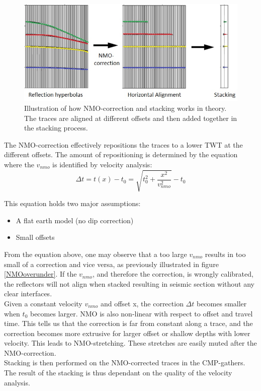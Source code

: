 \documentclass[10pt,a4paper]{article}
\begin{document}
\begin{figure}[H]
\includegraphics[width=\textwidth]{NMOcorr_stacking.jpg}
\caption{Illustration of how NMO-correction and stacking works in theory. The traces are aligned at different offsets and then added together in the stacking process.}
\label{NMOS}
\end{figure}

\noindent The NMO-correction effectively repositions the traces to a lower TWT at the different offsets. The amount of repositioning is determined by the equation where the $v_{nmo}$ is identified by velocity analysis:
$$
\Delta t = t(x) - t_0 = \sqrt{t_0^2 + \frac{x^2}{v_{nmo}^2}}-t_0
$$

This equation holds two major assumptions:

\begin{itemize}
    \item A flat earth model (no dip correction)
    \item Small offsets
\end{itemize}

\noindent From the equation above, one may observe that a too large $v_{nmo}$ results in too small of a correction and vice versa, as previously illustrated in figure \ref{NMOoverunder}. If the $v_{nmo}$, and therefore the correction, is wrongly calibrated, the reflectors will not align when stacked resulting in seismic section without any clear interfaces. 
\\
Given a constant velocity $v_{nmo}$ and offset x, the correction $\Delta t$ becomes smaller when $t_0$ becomes larger. NMO is also non-linear with respect to offset and travel time. This tells us that the correction is far from constant along a trace, and the correction becomes more extrusive for larger offset or shallow depths with lower velocity. This leads to NMO-stretching. These stretches are easily muted after the NMO-correction.
\\
Stacking is then performed on the NMO-corrected traces in the CMP-gathers. The result of the stacking is thus dependant on the quality of the velocity analysis.
\end{document}
